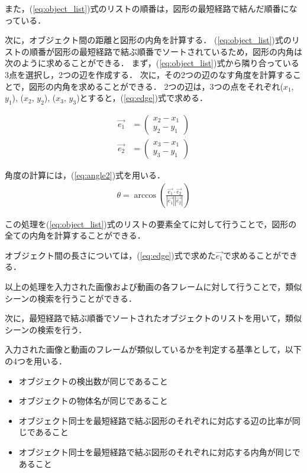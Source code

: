 \documentclass[a4j,12pt,dvipdfmx]{jreport}
\begin{document}
また，(\ref{eq:object_list})式のリストの順番は，図形の最短経路で結んだ順番になっている．

次に，オブジェクト間の距離と図形の内角を計算する．
(\ref{eq:object_list})式のリストの順番が図形の最短経路で結ぶ順番でソートされているため，図形の内角は次のように求めることができる．
まず，(\ref{eq:object_list})式から隣り合っている3点を選択し，2つの辺を作成する．
次に，その2つの辺のなす角度を計算することで，図形の内角を求めることができる．
2つの辺は，3つの点をそれぞれ($x_1$, $y_1$), ($x_2$, $y_2$), ($x_3$, $y_3$)とすると，(\ref{eq:edge})式で求める．

\begin{equation}
  \label{eq:edge}
  \begin{split}
    \vec{e_1} &= \left( \begin{array}{c} x_2-x_1 \\ y_2-y_1 \end{array} \right) \\
    \vec{e_2} &= \left( \begin{array}{c} x_3-x_1 \\ y_3-y_1 \end{array} \right)
  \end{split}
\end{equation}

角度の計算には，(\ref{eq:angle2})式を用いる．
\begin{eqnarray}
  \label{eq:angle2}
  \theta = \arccos \left( \frac{\vec{e_1} \cdot \vec{e_2}}{|\vec{e_1}| |\vec{e_2}|} \right)
\end{eqnarray}

この処理を(\ref{eq:object_list})式のリストの要素全てに対して行うことで，図形の全ての内角を計算することができる．

オブジェクト間の長さについては，(\ref{eq:edge})式で求めた$\vec{e_1}$で求めることができる．


以上の処理を入力された画像および動画の各フレームに対して行うことで，類似シーンの検索を行うことができる．


次に，最短経路で結ぶ順番でソートされたオブジェクトのリストを用いて，類似シーンの検索を行う．

入力された画像と動画のフレームが類似しているかを判定する基準として，以下の4つを用いる．
\begin{itemize}
  \item オブジェクトの検出数が同じであること
  \item オブジェクトの物体名が同じであること
  \item オブジェクト同士を最短経路で結ぶ図形のそれぞれに対応する辺の比率が同じであること
  \item オブジェクト同士を最短経路で結ぶ図形のそれぞれに対応する内角が同じであること
\end{itemize}
\end{document}
